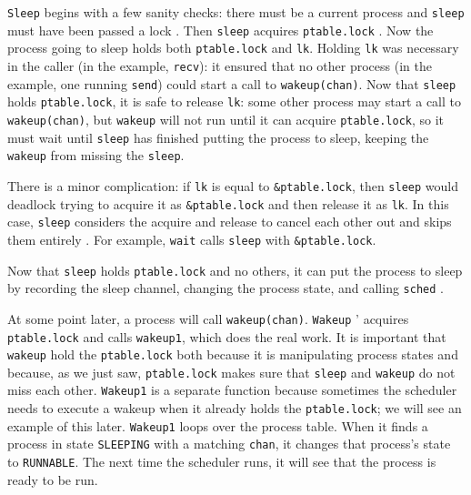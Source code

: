 \lstinline{Sleep}
begins with a few sanity checks:
there must be a current process
and
\lstinline{sleep}
must have been passed a lock
.
Then 
\lstinline{sleep}
acquires 
\lstinline{ptable.lock}
.
Now the process going to sleep holds both
\lstinline{ptable.lock}
and
\lstinline{lk}.
Holding
\lstinline{lk}
was necessary in the caller (in the example,
\lstinline{recv}):
it
ensured that no other process (in the example,
one running
\lstinline{send})
could start a call to
\lstinline{wakeup(chan)}.
Now that
\lstinline{sleep}
holds
\lstinline{ptable.lock},
it is safe to release
\lstinline{lk}:
some other process may start a call to
\lstinline{wakeup(chan)},
but
\lstinline{wakeup}
will not run until it can acquire
\lstinline{ptable.lock},
so it must wait until
\lstinline{sleep}
has finished putting the process to sleep,
keeping the
\lstinline{wakeup}
from missing the
\lstinline{sleep}.

There is a minor complication: if 
\lstinline{lk}
is equal to
\lstinline{&ptable.lock},
then
\lstinline{sleep}
would deadlock trying to acquire it as
\lstinline{&ptable.lock}
and then release it as
\lstinline{lk}.
In this case,
\lstinline{sleep}
considers the acquire and release
to cancel each other out
and skips them entirely
.
For example,
\lstinline{wait}
calls
\lstinline{sleep}
with 
\lstinline{&ptable.lock}.

Now that
\lstinline{sleep}
holds
\lstinline{ptable.lock}
and no others,
it can put the process to sleep by recording
the sleep channel,
changing the process state,
and calling
\lstinline{sched}
.

At some point later, a process will call
\lstinline{wakeup(chan)}.
\lstinline{Wakeup}
'
acquires
\lstinline{ptable.lock}
and calls
\lstinline{wakeup1},
which does the real work.
It is important that
\lstinline{wakeup}
hold the
\lstinline{ptable.lock}
both because it is manipulating process states
and because, as we just saw,
\lstinline{ptable.lock}
makes sure that
\lstinline{sleep}
and
\lstinline{wakeup}
do not miss each other.
\lstinline{Wakeup1}
is a separate function because
sometimes the scheduler needs to
execute a wakeup when it already
holds the 
\lstinline{ptable.lock};
we will see an example of this later.
\lstinline{Wakeup1}
loops over the process table.
When it finds a process in state
\lstinline{SLEEPING}
with a matching
\lstinline{chan},
it changes that process's state to
\lstinline{RUNNABLE}.
The next time the scheduler runs, it will
see that the process is ready to be run.

